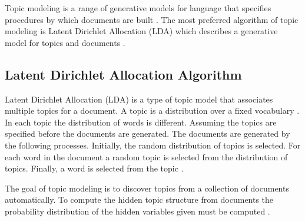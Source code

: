 Topic modeling is a range of generative models for language that specifies procedures by which documents are built \cite{blei2003latent}. The most preferred algorithm of topic modeling is Latent Dirichlet Allocation (LDA) which describes a generative model for topics and documents \cite{blei2003latent}. 

\subsection{Latent Dirichlet Allocation Algorithm} \label{ssec:LDAA}

Latent Dirichlet Allocation (LDA) is a type of topic model that associates multiple topics for a document. A topic is a distribution over a fixed vocabulary \cite{chaney2012visualizing}. In each topic the distribution of words is different. Assuming the topics are specified before the documents are generated. The documents are generated by the following processes. Initially, the random distribution of topics is selected. For each word in the document a random topic is selected from the distribution of topics. Finally, a word is selected from the topic \cite{blei2003latent,mekonnen2017topic}.

The goal of topic modeling is to discover topics from a collection of documents automatically. To compute the hidden topic structure from documents the probability distribution of the hidden variables given must be computed \cite{mimno2012sparse}.




